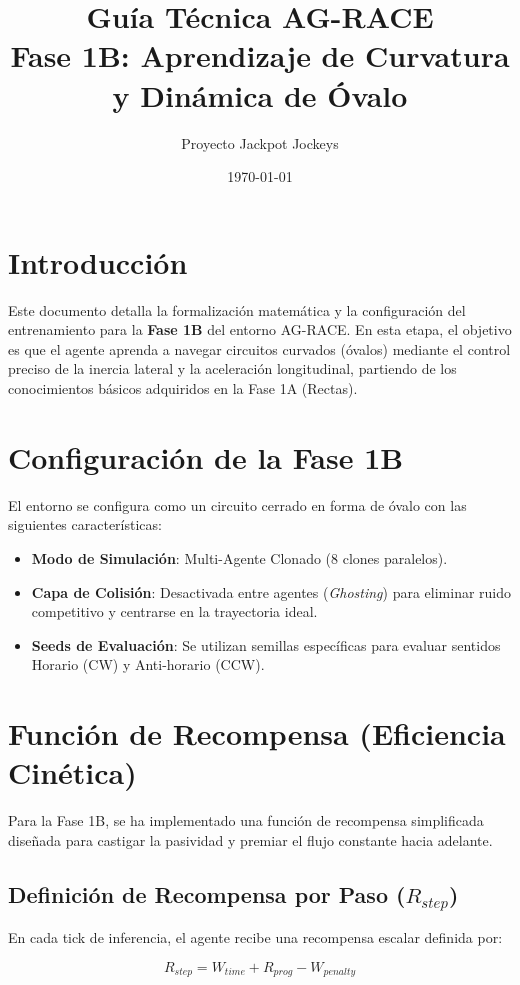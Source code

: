 \documentclass[12pt]{article}
\title{\textbf{Guía Técnica AG-RACE}\\ Fase 1B: Aprendizaje de Curvatura y Dinámica de Óvalo}
\author{Proyecto Jackpot Jockeys}
\date{\today}
\begin{document}
\maketitle

\section{Introducción}
Este documento detalla la formalización matemática y la configuración del entrenamiento para la \textbf{Fase 1B} del entorno AG-RACE. En esta etapa, el objetivo es que el agente aprenda a navegar circuitos curvados (óvalos) mediante el control preciso de la inercia lateral y la aceleración longitudinal, partiendo de los conocimientos básicos adquiridos en la Fase 1A (Rectas).

\section{Configuración de la Fase 1B}
El entorno se configura como un circuito cerrado en forma de óvalo con las siguientes características:
\begin{itemize}
    \item \textbf{Modo de Simulación}: Multi-Agente Clonado (8 clones paralelos).
    \item \textbf{Capa de Colisión}: Desactivada entre agentes (\textit{Ghosting}) para eliminar ruido competitivo y centrarse en la trayectoria ideal.
    \item \textbf{Seeds de Evaluación}: Se utilizan semillas específicas para evaluar sentidos Horario (CW) y Anti-horario (CCW).
\end{itemize}

\section{Función de Recompensa (Eficiencia Cinética)}
Para la Fase 1B, se ha implementado una función de recompensa simplificada diseñada para castigar la pasividad y premiar el flujo constante hacia adelante.

\subsection{Definición de Recompensa por Paso ($R_{step}$)}
En cada tick de inferencia, el agente recibe una recompensa escalar definida por:

\[ R_{step} = W_{time} + R_{prog} - W_{penalty} \]
\end{document}
